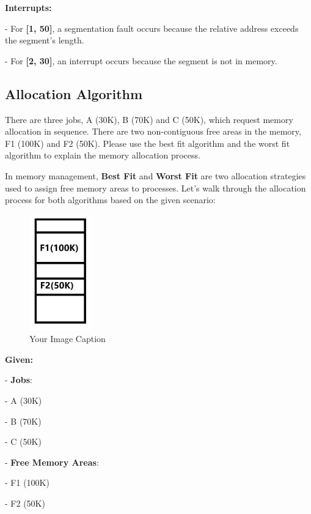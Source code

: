 \documentclass[a4paper]{book}
\begin{document}
\textbf{Interrupts:}

- For \textbf{[1, 50]}, a segmentation fault occurs because the relative address exceeds the segment's length.

- For \textbf{[2, 30]}, an interrupt occurs because the segment is not in memory.

\newpage

\subsection{Allocation Algorithm}

\begin{greenbox}
There are three jobs, A (30K), B (70K) and C (50K), which request memory allocation in sequence. There are two non-contiguous free areas in the memory, F1 (100K) and F2 (50K). Please use the best fit algorithm and the worst fit algorithm to explain the memory allocation process.

In memory management, \textbf{Best Fit} and \textbf{Worst Fit} are two allocation strategies used to assign free memory areas to processes. Let's walk through the allocation process for both algorithms based on the given scenario:
\end{greenbox}

\begin{figure}[h]
    \centering
    \includegraphics[height=5cm]{img/memory-virtual_memory.jpg}  %
    \caption{Your Image Caption}
    \label{fig:your_label}
\end{figure}

\textbf{Given:}

- \textbf{Jobs}:

  - A (30K)
  
  - B (70K)
  
  - C (50K)
  
- \textbf{Free Memory Areas}:

  - F1 (100K)
  
  - F2 (50K)
\end{document}
